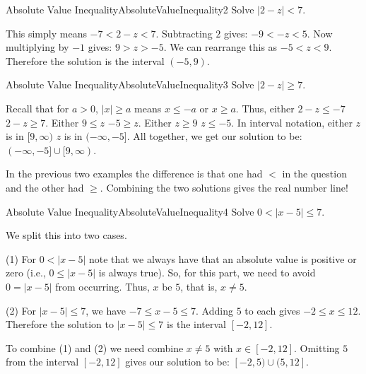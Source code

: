 \begin{example}{Absolute Value Inequality}{AbsoluteValueInequality2}
Solve $|2-z|<7$.
\end{example}

\begin{solution} 
This simply means $-7<2-z<7$.
Subtracting $2$ gives: $-9<-z<5$.
Now multiplying by $-1$ gives: $9>z>-5$. 
We can rearrange this as $-5<z<9$.
Therefore the solution is the interval $(-5,9)$.
\end{solution}

\bigskip

\begin{example}{Absolute Value Inequality}{AbsoluteValueInequality3}
Solve $|2-z|\geq 7$.
\end{example}

\begin{solution} 
Recall that for $a>0$, $|x|\geq a$ means $x\leq -a$ or $x\geq a$.
Thus, either $2-z\leq -7$  $2-z\geq 7$.
Either $9\leq z$  $-5 \geq z$.
Either $z\geq 9$  $z \leq -5$.
In interval notation, either $z$ is in $[9,\infty)$  $z$ is in $(-\infty,-5]$.
All together, we get our solution to be: $(-\infty,-5]\cup [9,\infty)$.
\end{solution}

In the previous two examples the  difference is that one had $<$ in 
the question and the other had $\geq$. Combining the two solutions gives the 
 real number line! \\

\begin{example}{Absolute Value Inequality}{AbsoluteValueInequality4}
Solve $0<|x-5|\leq 7$.
\end{example}

\begin{solution} 
We split this into two cases.

(1) For $0<|x-5|$ note that we always have that an absolute value is positive or zero (i.e., $0\leq |x-5|$ is always true).
So, for this part, we need to avoid $0=|x-5|$ from occurring. 
Thus, $x$  be $5$, that is, $x\neq 5$.

(2) For $|x-5|\leq 7$, we have $-7\leq x-5\leq 7$.
Adding $5$ to each gives $-2\leq x\leq 12$.
Therefore the solution to $|x-5|\leq 7$ is the interval $[-2,12]$.

To combine (1) and (2) we need combine $x\neq 5$ with $x\in[-2,12]$.
Omitting $5$ from the interval $[-2,12]$ gives our solution to be: $[-2,5)\cup(5,12]$.
\end{solution}
